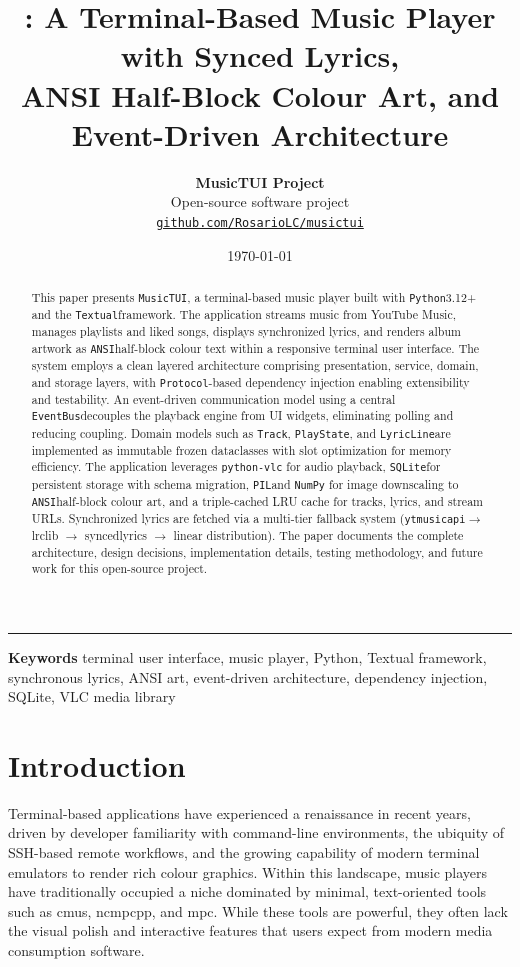 \documentclass[a4paper,11pt,twoside]{article}
\title{\textbf{\musictui: A Terminal-Based Music Player with Synced Lyrics,\\
ANSI Half-Block Colour Art, and Event-Driven Architecture}}
\author{\textbf{MusicTUI Project}\\[3pt]
  {\small Open-source software project}\\[1pt]
  {\small\href{https://github.com/RosarioLC/musictui}{\texttt{github.com/RosarioLC/musictui}}}}
\date{\today}
\makeatletter
\newcommand{\keywords}[1]{%
  \par\vspace{0.2em}\noindent
  {\singlespacing\small
   \textcolor{accent}{\sffamily\bfseries Keywords}\hspace{0.8em}%
   \textcolor{black!80}{#1}\par}%
  \vspace{0.2em}}
\renewcommand{\maketitle}{%
  \begingroup
  \thispagestyle{plain}%
  \singlespacing
  \par\noindent{\color{accent}\rule{\linewidth}{2.6pt}}\par
  \vspace{1.3em}%
  {\raggedright\sffamily\bfseries\fontsize{15}{20}\selectfont\color{accent!85!black}\@title\par}%
  \vspace{0.9em}%
  {\color{accentb}\rule{2.6cm}{1.5pt}}\par
  \vspace{0.9em}%
  {\raggedright\sffamily\large\color{ink}\@author\par}%
  \vspace{0.5em}%
  {\raggedright\sffamily\small\color{codegray}\@date\par}%
  \vspace{0.8em}%
  \noindent{\color{accent!30}\rule{\linewidth}{0.5pt}}\par
  \endgroup
}
\newcommand{\py}{\texttt{Python}}
\newcommand{\textual}{\texttt{Textual}}
\newcommand{\sqlite}{\texttt{SQLite}}
\newcommand{\ansi}{\texttt{ANSI}}
\newcommand{\ytmusic}{\texttt{ytmusicapi}}
\newcommand{\pil}{\texttt{PIL}}
\newcommand{\musictui}{\texttt{MusicTUI}}
\newcommand{\eventbus}{\texttt{EventBus}}
\newcommand{\protocol}{\texttt{Protocol}}
\newcommand{\track}{\texttt{Track}}
\newcommand{\lyric}{\texttt{LyricLine}}
\newcommand{\playstate}{\texttt{PlayState}}
\newcommand{\pyvlc}{\texttt{python-vlc}\xspace}
\newcommand{\numpy}{\texttt{NumPy}\xspace}
\makeatother
\begin{document}
\maketitle

\begin{abstract}
    This paper presents \musictui, a terminal-based music player built with
    \py 3.12+ and the \textual framework. The application streams music from
    YouTube Music, manages playlists and liked songs, displays synchronized
    lyrics, and renders album artwork as \ansi half-block colour text within
    a responsive terminal user interface. The system employs a clean layered
    architecture comprising presentation, service, domain, and storage layers,
    with \protocol-based dependency injection enabling extensibility and
    testability. An event-driven communication model using a central
    \eventbus decouples the playback engine from UI widgets, eliminating
    polling and reducing coupling. Domain models such as \track, \playstate,
    and \lyric are implemented as immutable frozen dataclasses with slot
    optimization for memory efficiency. The application leverages \pyvlc for
    audio playback, \sqlite for persistent storage with schema migration,
    \pil and \numpy for image downscaling to \ansi half-block colour art,
    and a triple-cached LRU cache for tracks, lyrics, and stream URLs.
    Synchronized lyrics are fetched via a multi-tier fallback system
    (\ytmusic \(\rightarrow\) lrclib \(\rightarrow\) syncedlyrics
    \(\rightarrow\) linear distribution). The paper documents the complete
    architecture, design decisions, implementation details, testing
    methodology, and future work for this open-source project.
\end{abstract}

\keywords{terminal user interface, music player, Python, Textual framework, synchronous lyrics, ANSI art, event-driven architecture, dependency injection, SQLite, VLC media library}

\section{Introduction}

Terminal-based applications have experienced a renaissance in recent years,
driven by developer familiarity with command-line environments, the ubiquity
of SSH-based remote workflows, and the growing capability of modern terminal
emulators to render rich colour graphics. Within this landscape, music players
have traditionally occupied a niche dominated by minimal, text-oriented tools
such as cmus, ncmpcpp, and mpc. While these tools are powerful, they often
lack the visual polish and interactive features that users expect from modern
media consumption software.
\end{document}
